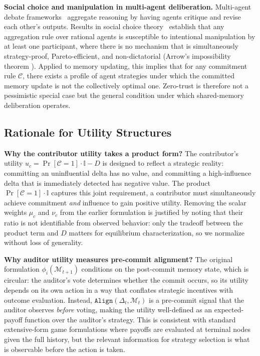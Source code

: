 \textbf{Social choice and manipulation in multi-agent deliberation.}
Multi-agent debate frameworks~\citep{du2024improving, liang2024encouraging,
chan2023chateval, xiong2023examining, wang2024rethinking}
aggregate reasoning by having agents critique and revise each other's outputs.
Results in social choice theory~\citep{arrow2012social, gibbard1973manipulation,
satterthwaite1975strategy} establish that any aggregation rule over rational agents
is susceptible to intentional manipulation by at least one participant, where there is
no mechanism that is simultaneously strategy-proof, Pareto-efficient, and
non-dictatorial (Arrow's impossibility theorem \citep{geanakoplos2005three}). Applied to memory updating,
this implies that for any commitment rule $\mathcal{C}$, there exists a profile
of agent strategies under which the committed memory update is not the
collectively optimal one. Zero-trust is therefore not a pessimistic special case
but the general condition under which shared-memory deliberation operates.

\subsection{Rationale for Utility Structures}
\label{app:utility_rationale}

\textbf{Why the contributor utility takes a product form?}
The contributor's utility $u_c = \Pr[\mathcal{C}=1] \cdot \mathbb{I} - D$
is designed to reflect a strategic reality: committing an uninfluential
delta has no value, and committing a high-influence delta that is immediately
detected has negative value. The product $\Pr[\mathcal{C}=1] \cdot
\mathbb{I}$ captures this joint requirement, a contributor must
simultaneously achieve commitment \emph{and} influence to gain positive
utility. Removing the scalar weights $\mu_c$ and $\nu_c$ from the earlier
formulation is justified by noting that their ratio is not identifiable
from observed behavior: only the tradeoff between the product term and $D$
matters for equilibrium characterization, so we normalize without loss of
generality.

\textbf{Why auditor utility measures pre-commit alignment?}
The original formulation $\phi_i(\mathcal{M}_{t+1})$ conditions on the
post-commit memory state, which is circular: the auditor's vote determines
whether the commit occurs, so its utility depends on its own action in a
way that conflates strategic incentives with outcome evaluation. Instead,
$\texttt{Align}(\Delta_t, \mathcal{M}_t)$ is a pre-commit signal that the
auditor observes \emph{before} voting, making the utility well-defined as
an expected-payoff function over the auditor's strategy. This is consistent
with standard extensive-form game formulations where payoffs are evaluated
at terminal nodes given the full history, but the relevant information for
strategy selection is what is observable before the action is taken.


